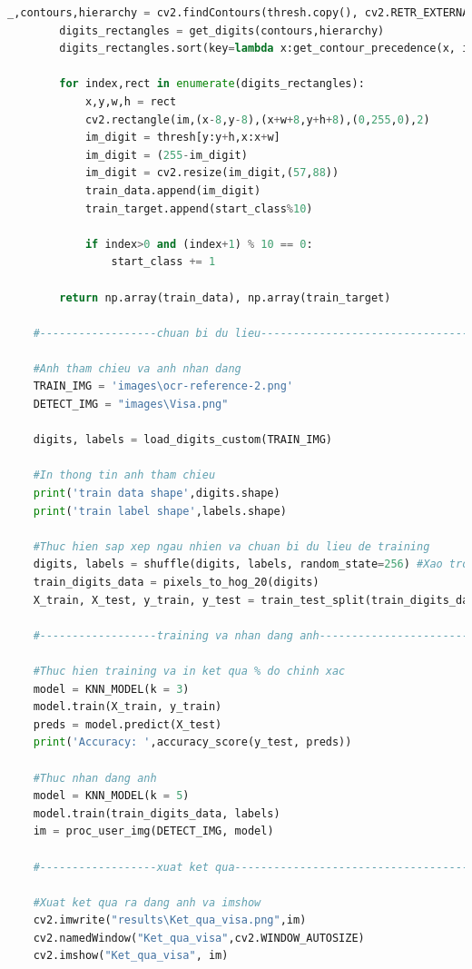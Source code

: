 \begin{lstlisting}[language=Python, caption=Recognition Visa]
        _,contours,hierarchy = cv2.findContours(thresh.copy(), cv2.RETR_EXTERNAL, cv2.CHAIN_APPROX_SIMPLE)
        digits_rectangles = get_digits(contours,hierarchy)  
        digits_rectangles.sort(key=lambda x:get_contour_precedence(x, im.shape[1]))
         
        for index,rect in enumerate(digits_rectangles):
            x,y,w,h = rect
            cv2.rectangle(im,(x-8,y-8),(x+w+8,y+h+8),(0,255,0),2)
            im_digit = thresh[y:y+h,x:x+w]
            im_digit = (255-im_digit)
            im_digit = cv2.resize(im_digit,(57,88))
            train_data.append(im_digit)
            train_target.append(start_class%10)
    
            if index>0 and (index+1) % 10 == 0:
                start_class += 1
        
        return np.array(train_data), np.array(train_target)
    
    #------------------chuan bi du lieu--------------------------------------------
    
    #Anh tham chieu va anh nhan dang
    TRAIN_IMG = 'images\ocr-reference-2.png'
    DETECT_IMG = "images\Visa.png"
    
    digits, labels = load_digits_custom(TRAIN_IMG) 
    
    #In thong tin anh tham chieu 
    print('train data shape',digits.shape)
    print('train label shape',labels.shape)
    
    #Thuc hien sap xep ngau nhien va chuan bi du lieu de training
    digits, labels = shuffle(digits, labels, random_state=256) #Xao tron du lieu
    train_digits_data = pixels_to_hog_20(digits)
    X_train, X_test, y_train, y_test = train_test_split(train_digits_data, labels, test_size=0.7)
    
    #------------------training va nhan dang anh----------------------------------------
    
    #Thuc hien training va in ket qua % do chinh xac
    model = KNN_MODEL(k = 3)
    model.train(X_train, y_train)
    preds = model.predict(X_test)
    print('Accuracy: ',accuracy_score(y_test, preds))
    
    #Thuc nhan dang anh 
    model = KNN_MODEL(k = 5)
    model.train(train_digits_data, labels)
    im = proc_user_img(DETECT_IMG, model)
    
    #------------------xuat ket qua----------------------------------------
    
    #Xuat ket qua ra dang anh va imshow
    cv2.imwrite("results\Ket_qua_visa.png",im)
    cv2.namedWindow("Ket_qua_visa",cv2.WINDOW_AUTOSIZE)
    cv2.imshow("Ket_qua_visa", im)
    

\end{lstlisting}
